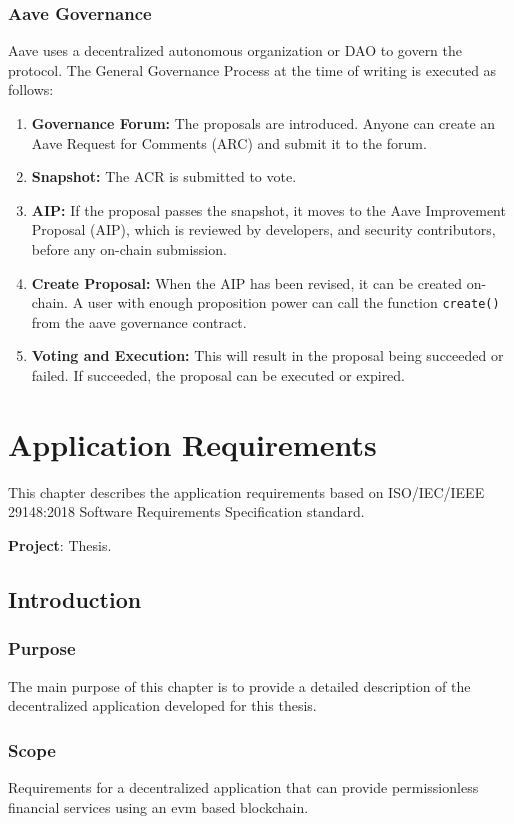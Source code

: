 \documentclass[11pt,a4paper]{report}
\begin{document}
\subsection{Aave Governance}\label{governance}
Aave\cite{aaveV1GOV} uses a decentralized autonomous organization or DAO\cite{wiki:Dao} to govern the protocol. The General Governance Process\cite{gov} at the time of writing is executed as follows:
\begin{enumerate}
	\item \textbf{Governance Forum\cite{govForum}:} The proposals are introduced. Anyone can create an Aave Request for Comments (ARC)\cite{arc} and submit it to the forum.
	\item \textbf{Snapshot\cite{snapshot}:} The ACR is submitted to vote.
	\item \textbf{AIP:} If the proposal passes the snapshot, it moves to the Aave Improvement Proposal (AIP), which is reviewed by developers, and security contributors, before any on-chain submission.
	\item \textbf{Create Proposal:} When the AIP has been revised, it can be created on-chain. A user with enough proposition power can call the function \verb|create()|\cite{create} from the aave governance contract.
	\item \textbf{Voting and Execution:} This will result in the proposal being succeeded or failed. If succeeded, the proposal can be executed or expired.
\end{enumerate}

\chapter{Application Requirements} \label{ch:appreq}
This chapter describes the application requirements based on ISO/IEC/IEEE 29148:2018\cite{iso} Software Requirements Specification standard.

\textbf{Project}: Thesis.
\section{Introduction}
\subsection{Purpose}
The main purpose of this chapter is to provide a detailed description of the decentralized application developed for this thesis. 
\subsection{Scope}
Requirements for a decentralized application that can provide
permissionless financial services using an evm based blockchain.
\end{document}
